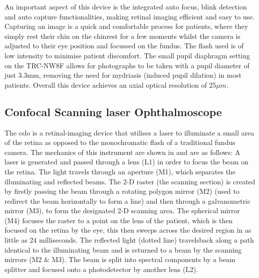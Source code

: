 An important aspect of this device is the integrated auto focus, blink
detection and auto capture functionalities, making retinal imaging
efficient and easy to use. Capturing an image is a quick and comfortable
process for patients, where they simply rest their chin on the chinrest for a
few moments whilst the camera is adjusted to their eye position and
focussed on the fundus. The flash used is of low intensity to minimise
patient discomfort. The small pupil diaphragm setting on the TRC-NW8F
allows for photographs to be
taken with a pupil diameter of just 3.3mm, removing the need for mydriasis
(induced pupil dilation) in most patients. Overall this device achieves
an axial optical resolution of 25$\mu m$.


\subsection{Confocal Scanning \gls{laser} Ophthalmoscope}

The \Gls{cslo} is a retinal-imaging device that utilises a \gls{laser} to illuminate a small area of the retina as
opposed to the monochromatic flash of a traditional fundus camera.
The mechanics of this instrument are shown in  and are as
follows: A \gls{laser} is generated and passed through a lens (L1) in order
to focus the beam on the retina. The light travels through an aperture (M1),
which separates the illuminating and reflected beams. The 2-D raster (the
scanning section) is created by firstly passing the beam through a rotating
polygon mirror (M2) (used to redirect the beam horizontally to form a line)
and then through a galvanometric mirror (M3), to form the designated 2-D
scanning area. The spherical mirror (M4) focuses the raster to a point
on the lens of the patient, which is then focused on the retina by the eye,
this then sweeps across the desired region in as little as 24 milliseconds.
The reflected light (dotted line) travelsback along a path identical to the
illuminating beam and is returned to a beam by the scanning mirrors (M2 \&
M3). The beam is split into spectral components by a beam splitter and
focused onto a photodetector by another lens (L2).\cite{webb1987confocal}

